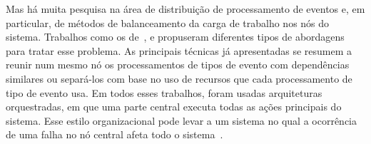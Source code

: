 Mas há muita pesquisa na área de distribuição de processamento de eventos e, em particular, de métodos de balanceamento da carga de trabalho nos nós do sistema. Trabalhos como os de~\cite{Isoyama:2012:SCE:2335484.2335498}, \cite{6906776} e \cite{Balkesen:2013:RRI:2488222.2488257} propuseram diferentes tipos de abordagens para tratar esse problema. As principais técnicas já apresentadas
se resumem a reunir num mesmo nó os processamentos de tipos de evento com dependências similares ou separá-los com base no uso de recursos que cada processamento de tipo de evento usa. Em todos esses trabalhos, foram usadas  arquiteturas orquestradas, em que uma parte central executa todas as ações principais do sistema. Esse estilo organizacional pode levar a um sistema no qual a ocorrência de uma falha no nó central afeta todo o sistema~\citep{Newman:2015:BM:2904388}. 








